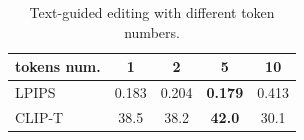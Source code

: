 \begin{table}[h]
\centering
\caption{Text-guided editing with different token numbers. }
\begin{tabular}{lcccc} 
\toprule
 tokens num. & 1     & 2     & 5                & 10     \\ 
\midrule
LPIPS     & 0.183 & 0.204 & \textbf{0.179} & 0.413  \\
CLIP-T    & 38.5  & 38.2  & \textbf{42.0}  & 30.1   \\
\bottomrule
\end{tabular}
\vspace{-8pt}
\label{tab::abl_tokens}
\end{table}




